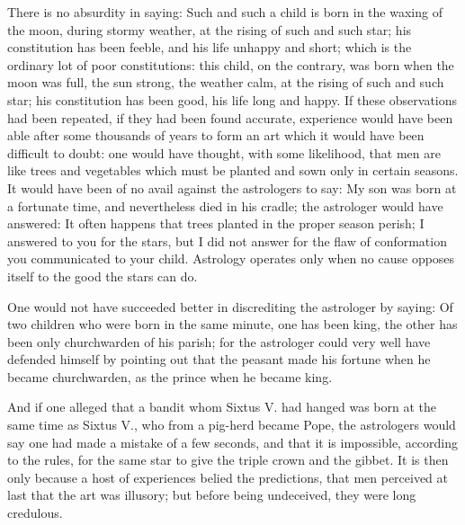 There is no absurdity in saying: Such and such a child is born in the
waxing of the moon, during stormy weather, at the rising of such and
such star; his constitution has been feeble, and his life unhappy and
short; which is the ordinary lot of poor constitutions: this child, on
the contrary, was born when the moon was full, the sun strong, the
weather calm, at the rising of such and such star; his constitution has
been good, his life long and happy. If these observations had been
repeated, if they had been found accurate, experience would have been
able after some thousands of years to form an art which it would have
been difficult to doubt: one would have thought, with some likelihood,
that men are like trees and vegetables which must be planted and sown
only in certain seasons. It would have been of no avail against the
astrologers to say: My son was born at a fortunate time, and
nevertheless died in his cradle; the astrologer would have answered: It
often happens that trees planted in the proper season perish; I answered
to you for the stars, but I did not answer for the flaw of conformation
you communicated to your child. Astrology operates only when no cause
opposes itself to the good the stars can do.

One would not have succeeded better in discrediting the astrologer by
saying: Of two children who were born in the same minute, one has been
king, the other has been only churchwarden of his parish; for the
astrologer could very well have defended himself by pointing out that
the peasant made his fortune when he became churchwarden, as the prince
when he became king.

And if one alleged that a bandit whom Sixtus V. had hanged was born at
the same time as Sixtus V., who from a pig-herd became Pope, the
astrologers would say one had made a mistake of a few seconds, and that
it is impossible, according to the rules, for the same star to give the
triple crown and the gibbet. It is then only because a host of
experiences belied the predictions, that men perceived at last that the
art was illusory; but before being undeceived, they were long credulous.

